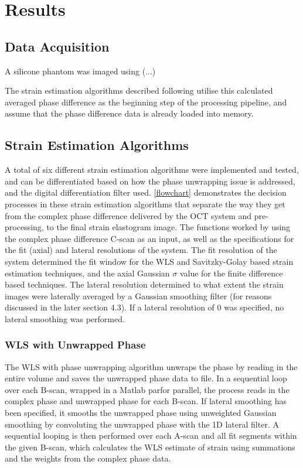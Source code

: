 \chapter{Results}\label{results}


\section{Data Acquisition}\label{data}
A silicone phantom was imaged using (...)

The strain estimation algorithms described following utilise this calculated averaged phase difference as the beginning step of the processing pipeline, and assume that the phase difference data is already loaded into memory.

\section{Strain Estimation Algorithms}\label{algorithms}

A total of six different strain estimation algorithms were implemented and tested, and can be differentiated based on how the phase unwrapping issue is addressed, and the digital differentiation filter used. \autoref{flowchart} demonstrates the decision processes in these strain estimation algorithms that separate the way they get from the complex phase difference delivered by the OCT system and pre-processing, to the final strain elastogram image.
The functions worked by using the complex phase difference C-scan as an input, as well as the specifications for the fit (axial) and lateral resolutions of the system. The fit resolution of the system determined the fit window for the WLS and Savitzky-Golay based strain estimation techniques, and the axial Gaussian $\sigma$ value for the finite difference based techniques. The lateral resolution determined to what extent the strain images were laterally averaged by a Gaussian smoothing filter (for reasons discussed in the later section 4.3). If a lateral resolution of 0 was specified, no lateral smoothing was performed. 

\subsection{WLS with Unwrapped Phase}
The WLS with phase unwrapping algorithm unwraps the phase by reading in the entire volume and saves the unwrapped phase data to file. In a sequential loop over each B-scan, wrapped in a Matlab parfor parallel, the process reads in the complex phase and unwrapped phase for each B-scan. If lateral smoothing has been specified, it smooths the unwrapped phase using unweighted Gaussian smoothing by convoluting the unwrapped phase with the 1D lateral filter. A sequential looping is then performed over each A-scan and all fit segments within the given B-scan, which calculates the WLS estimate of strain using summations and the weights from the complex phase data.

